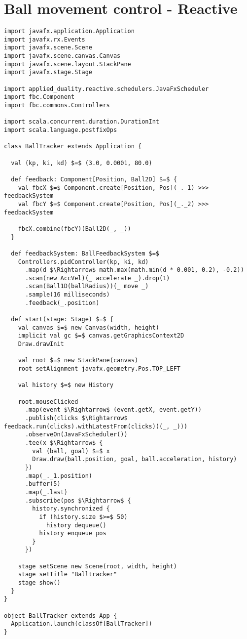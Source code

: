 \chapter{Ball movement control - Reactive}
\label{app:ball-movement-reactive}

\hspace*{-\parindent}
\begin{lstlisting}[style=ScalaStyle, caption={Ball movement control}, label={lst:ball-full-app-reactive}]
import javafx.application.Application
import javafx.rx.Events
import javafx.scene.Scene
import javafx.scene.canvas.Canvas
import javafx.scene.layout.StackPane
import javafx.stage.Stage

import applied_duality.reactive.schedulers.JavaFxScheduler
import fbc.Component
import fbc.commons.Controllers

import scala.concurrent.duration.DurationInt
import scala.language.postfixOps

class BallTracker extends Application {

  val (kp, ki, kd) $=$ (3.0, 0.0001, 80.0)

  def feedback: Component[Position, Ball2D] $=$ {
    val fbcX $=$ Component.create[Position, Pos](_._1) >>> feedbackSystem
    val fbcY $=$ Component.create[Position, Pos](_._2) >>> feedbackSystem

    fbcX.combine(fbcY)(Ball2D(_, _))
  }

  def feedbackSystem: BallFeedbackSystem $=$
    Controllers.pidController(kp, ki, kd)
      .map(d $\Rightarrow$ math.max(math.min(d * 0.001, 0.2), -0.2))
      .scan(new AccVel)(_ accelerate _).drop(1)
      .scan(Ball1D(ballRadius))(_ move _)
      .sample(16 milliseconds)
      .feedback(_.position)

  def start(stage: Stage) $=$ {
    val canvas $=$ new Canvas(width, height)
    implicit val gc $=$ canvas.getGraphicsContext2D
    Draw.drawInit

    val root $=$ new StackPane(canvas)
    root setAlignment javafx.geometry.Pos.TOP_LEFT

    val history $=$ new History

    root.mouseClicked
      .map(event $\Rightarrow$ (event.getX, event.getY))
      .publish(clicks $\Rightarrow$ feedback.run(clicks).withLatestFrom(clicks)((_, _)))
      .observeOn(JavaFxScheduler())
      .tee(x $\Rightarrow$ {
        val (ball, goal) $=$ x
        Draw.draw(ball.position, goal, ball.acceleration, history)
      })
      .map(_._1.position)
      .buffer(5)
      .map(_.last)
      .subscribe(pos $\Rightarrow$ {
        history.synchronized {
          if (history.size $>=$ 50)
            history dequeue()
          history enqueue pos
        }
      })

    stage setScene new Scene(root, width, height)
    stage setTitle "Balltracker"
    stage show()
  }
}

object BallTracker extends App {
  Application.launch(classOf[BallTracker])
}
\end{lstlisting}

